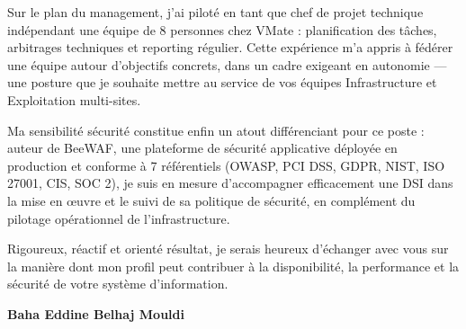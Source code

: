 \documentclass[a4paper,11pt]{article}
\begin{document}
Sur le plan du management, j'ai piloté en tant que chef de projet technique indépendant une équipe de 8 personnes chez VMate : planification des tâches, arbitrages techniques et reporting régulier. Cette expérience m'a appris à fédérer une équipe autour d'objectifs concrets, dans un cadre exigeant en autonomie --- une posture que je souhaite mettre au service de vos équipes Infrastructure et Exploitation multi-sites.

Ma sensibilité sécurité constitue enfin un atout différenciant pour ce poste : auteur de BeeWAF, une plateforme de sécurité applicative déployée en production et conforme à 7 référentiels (OWASP, PCI DSS, GDPR, NIST, ISO 27001, CIS, SOC 2), je suis en mesure d'accompagner efficacement une DSI dans la mise en œuvre et le suivi de sa politique de sécurité, en complément du pilotage opérationnel de l'infrastructure.

Rigoureux, réactif et orienté résultat, je serais heureux d'échanger avec vous sur la manière dont mon profil peut contribuer à la disponibilité, la performance et la sécurité de votre système d'information.

\vspace{0.8cm}

\begin{flushright}
{\bfseries Baha Eddine Belhaj Mouldi}
\end{flushright}
\end{document}
